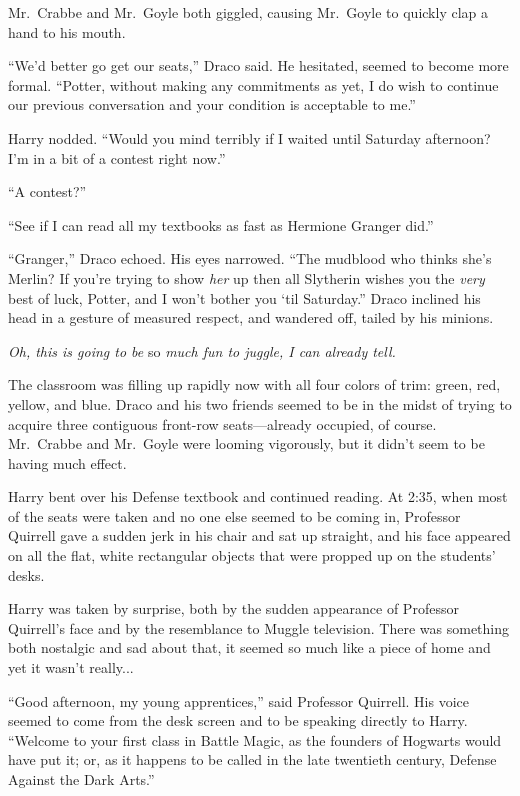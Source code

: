 Mr.~Crabbe and Mr.~Goyle both giggled, causing Mr.~Goyle to quickly clap a hand to his mouth.

“We’d better go get our seats,” Draco said. He hesitated, seemed to become more formal. “Potter, without making any commitments as yet, I do wish to continue our previous conversation and your condition is acceptable to me.”

Harry nodded. “Would you mind terribly if I waited until Saturday afternoon? I’m in a bit of a contest right now.”

“A contest?”

“See if I can read all my textbooks as fast as Hermione Granger did.”

“Granger,” Draco echoed. His eyes narrowed. “The mudblood who thinks she’s Merlin? If you’re trying to show \emph{her} up then all Slytherin wishes you the \emph{very} best of luck, Potter, and I won’t bother you ‘til Saturday.” Draco inclined his head in a gesture of measured respect, and wandered off, tailed by his minions.

\emph{Oh, this is going to be} so \emph{much fun to juggle, I can already tell.}

The classroom was filling up rapidly now with all four colors of trim: green, red, yellow, and blue. Draco and his two friends seemed to be in the midst of trying to acquire three contiguous front-row seats—already occupied, of course. Mr.~Crabbe and Mr.~Goyle were looming vigorously, but it didn’t seem to be having much effect.

Harry bent over his Defense textbook and continued reading.
\sbreak
At 2:35\PM, when most of the seats were taken and no one else seemed to be coming in, Professor Quirrell gave a sudden jerk in his chair and sat up straight, and his face appeared on all the flat, white rectangular objects that were propped up on the students’ desks.

Harry was taken by surprise, both by the sudden appearance of Professor Quirrell’s face and by the resemblance to Muggle television. There was something both nostalgic and sad about that, it seemed so much like a piece of home and yet it wasn’t really...

“Good afternoon, my young apprentices,” said Professor Quirrell. His voice seemed to come from the desk screen and to be speaking directly to Harry. “Welcome to your first class in Battle Magic, as the founders of Hogwarts would have put it; or, as it happens to be called in the late twentieth century, Defense Against the Dark Arts.”

